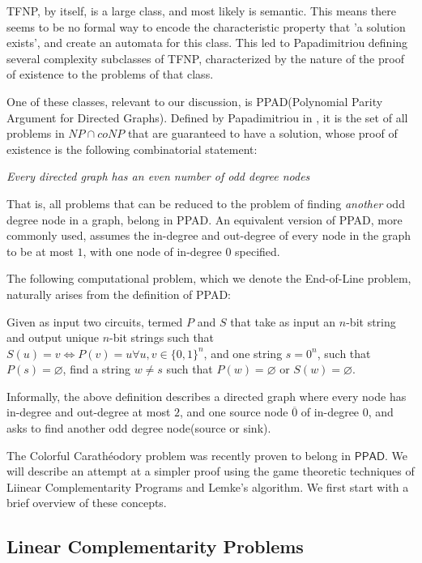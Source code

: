 \documentclass[a4paper,11pt]{article}
\def\cc#1{\mathsf{#1}}
\def\PPAD{\ensuremath{\cc{PPAD}}\xspace}
\def\CC{Colorful Carath\'eodory }
\begin{document}
TFNP, by itself, is a large class, and most likely is semantic. This means there seems to be no formal way to encode the characteristic property that 'a solution exists', and create an automata for this class. This led to Papadimitriou defining several complexity subclasses of TFNP, characterized by the nature of the proof of existence to the problems of that class. 

One of these classes, relevant to our discussion, is PPAD(Polynomial Parity Argument for Directed Graphs). Defined by Papadimitriou in \cite{CP}, it is the set of all problems in $NP\cap coNP$ that are guaranteed to have a solution, whose proof of existence is the following combinatorial statement:
\begin{center}
\textit{Every directed graph has an even number of odd degree nodes}
\end{center}
That is, all problems that can be reduced to the problem of finding \textit{another} odd degree node in a graph, belong in PPAD. An equivalent version of PPAD, more commonly used, assumes the in-degree and out-degree of every node in the graph to be at most $1$, with one node of in-degree $0$ specified.  

The following computational problem, which we denote the End-of-Line problem, naturally arises from the definition of PPAD:
\begin{definition}
Given as input two circuits, termed $P$ and $S$ that take as input an $n$-bit string and output unique $n$-bit strings such that $S(u)=v \Leftrightarrow P(v)=u \forall u,v\in \{0,1\}^n$, and one string $s=0^n$, such that $P(s)=\varnothing$, find a string $w\neq s$ such that $P(w)=\varnothing$ or $S(w)=\varnothing$.  
\end{definition}

Informally, the above definition describes a directed graph where every node has in-degree and out-degree at most $2$, and one source node $\overline{0}$ of in-degree $0$, and asks to find another odd degree node(source or sink). 

The \CC problem was recently proven to belong in \PPAD\cite{CCP_PPAD}. We will describe an attempt at a simpler proof using the game theoretic techniques of Liinear Complementarity Programs and Lemke's algorithm. We first start with a brief overview of these concepts.

\subsection{Linear Complementarity Problems}
\end{document}
